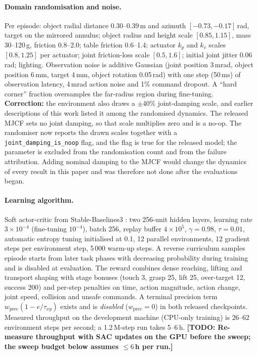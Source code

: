 \documentclass{article}
\newcommand{\todo}[1]{{\color{red}\textbf{[TODO: #1]}}}
\begin{document}
\paragraph{Domain randomisation and noise.}
Per episode: object radial distance 0.30--0.39\,m and azimuth $[-0.73,-0.17]$\,rad,
target on the mirrored annulus; object radius and height scale $[0.85,1.15]$,
mass 30--120\,g, friction 0.8--2.0; table friction 0.6--1.4; actuator $k_p$ and
$k_v$ scales $[0.8,1.25]$ per actuator; joint friction-loss scale $[0.5,1.6]$;
initial joint jitter 0.06\,rad; lighting. Observation noise is additive Gaussian
(joint position 3\,mrad, object position 6\,mm, target 4\,mm, object rotation
0.05\,rad) with one step (50\,ms) of observation latency, 4\,mrad action noise
and 1\% command dropout. A ``hard corner'' fraction oversamples the far-radius
region during fine-tuning. \textbf{Correction:} the environment also draws a
$\pm40\%$ joint-damping scale, and earlier descriptions of this work listed it
among the randomised dynamics. The released MJCF sets no joint damping, so that
scale multiplies zero and is a no-op. The randomiser now reports the drawn
scales together with a \texttt{joint\_damping\_is\_noop} flag, and the flag is
true for the released model; the parameter is excluded from the randomisation
count and from the failure attribution. Adding nominal damping to the MJCF
would change the dynamics of every result in this paper and was therefore not
done after the evaluations began.

\paragraph{Learning algorithm.}
Soft actor-critic \citep{haarnoja2018sac} from Stable-Baselines3
\citep{raffin2021sb3}: two 256-unit hidden layers, learning rate
$3{\times}10^{-4}$ (fine-tuning $10^{-4}$), batch 256, replay buffer
$4{\times}10^5$, $\gamma{=}0.98$, $\tau{=}0.01$, automatic entropy tuning
initialised at 0.1, 12 parallel environments, 12 gradient steps per environment
step, 5\,000 warm-up steps. A reverse curriculum samples episode starts from
later task phases with decreasing probability during training and is disabled at
evaluation. The reward combines dense reaching, lifting and transport shaping
with stage bonuses (touch 3, grasp 25, lift 25, over-target 12, success 200) and
per-step penalties on time, action magnitude, action change, joint speed,
collision and unsafe commands. A terminal precision term
$w_{\mathrm{prec}}(1 - e/\tau_{xy})$ exists and is \emph{disabled}
($w_{\mathrm{prec}}{=}0$) in both released checkpoints. Measured throughput on
the development machine (CPU-only training) is 26--62 environment steps per
second; a 1.2\,M-step run takes 5--6\,h. \todo{Re-measure throughput with SAC
updates on the GPU before the sweep; the sweep budget below assumes $\le 6$\,h
per run.}
\end{document}
